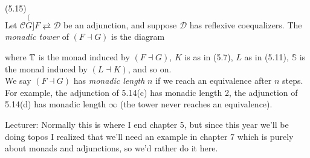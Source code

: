 \documentclass[a4paper]{article}
\begin{document}
\begin{defi} (5.15)\\
    Let $\mathcal{C} \stackrel[G]{F}{\rightleftarrows} \mathcal{D}$ be an adjunction, and suppose $\mathcal{D}$ has reflexive coequalizers. The \emph{monadic tower} of $(F \dashv G)$ is the diagram


    where $\mathbb{T}$ is the monad induced by $(F \dashv G)$, $K$ is as in (5.7), $L$ as in (5.11), $\mathbb{S}$ is the monad induced by $(L \dashv K)$, and so on.\\
    We say $(F \dashv G)$ has \emph{monadic length} $n$ if we reach an equivalence after $n$ steps.\\
    For example, the adjunction of 5.14(c) has monadic length 2, the adjunction of 5.14(d) has monadic length $\infty$ (the tower never reaches an equivalence).
\end{defi}

Lecturer: Normally this is where I end chapter 5, but since this year we'll be doing topos I realized that we'll need an example in chapter 7 which is purely about monads and adjunctions, so we'd rather do it here.
\end{document}
